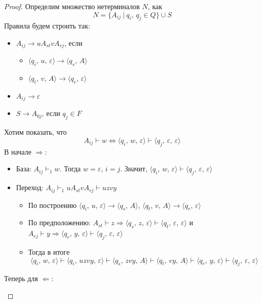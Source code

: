 \documentclass[a4paper,12pt]{article}
\theoremstyle{plain}
\theoremstyle{definition}
\theoremstyle{remark}
\begin{document}
\begin{proof}
	Определим множество нетерминалов $N$, как
	\[
		N = \{A_{ij} \:\vert\: q_i,\, q_j \in Q\} \cup S
	\]
	Правила будем строить так:
	\begin{itemize}
		\item $A_{ij} \to uA_{st}vA_{rj}$, если
		      \begin{itemize}
			      \item $\langle q_i,\, u,\, \varepsilon\rangle\to\langle q_s,\, A\rangle$
			      \item $\langle q_t,\,v,\,A\rangle\to\langle q_r,\, \varepsilon\rangle$
		      \end{itemize}
		\item $A_{ij} \to \varepsilon$
		\item $S \to A_{0j}$, если $q_j \in F$
	\end{itemize}
	Хотим показать, что
	\[
		A_{ij} \vdash w \Leftrightarrow \langle q_i,\, w,\, \varepsilon\rangle \vdash\langle q_j,\, \varepsilon,\, \varepsilon\rangle
	\]
	В начале $\Rightarrow$:
	\begin{itemize}
		\item База: $A_{ij} \vdash_1 w$. Тогда $w = \varepsilon,\, i = j$. Значит, $\langle q_i,\, w,\, \varepsilon\rangle \vdash \langle q_j,\, \varepsilon,\,\varepsilon\rangle$
		\item Переход: $A_{ij} \vdash_1 uA_{st}vA_{rj} \vdash uzvy$
		      \begin{itemize}
			      \item По построению 			$\langle q_i,\, u,\, \varepsilon\rangle\to\langle q_s,\, A\rangle$, $\langle q_t,\,v,\,A\rangle\to\langle q_r,\, \varepsilon\rangle$
			      \item По предположению: $A_{st} \vdash z \Rightarrow \langle q_s,\, z,\, \varepsilon\rangle \vdash\langle q_t,\, \varepsilon,\, \varepsilon\rangle$ и $A_{rj} \vdash y \Rightarrow \langle q_r,\, y,\, \varepsilon\rangle\vdash\langle q_j,\, \varepsilon,\, \varepsilon\rangle$
			      \item Тогда в итоге
			            \[
				            \langle q_i,\, w,\, \varepsilon\rangle \vdash \langle q_i,\, uzvy,\, \varepsilon\rangle \vdash \langle q_s,\, zvy,\, A\rangle \vdash \langle q_t,\, vy,\, A\rangle \vdash \langle q_r,\, y,\, \varepsilon\rangle \vdash \langle q_j,\, \varepsilon,\, \varepsilon\rangle
			            \]
		      \end{itemize}
	\end{itemize}
	Теперь для $\Leftarrow$:
	\begin{itemize}

\end{itemize}
\end{proof}
\end{document}
